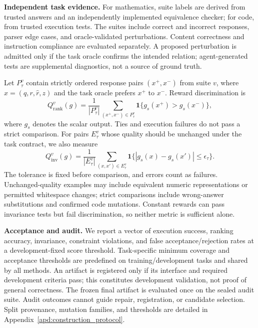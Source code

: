 \noindent\textbf{Independent task evidence.} For mathematics, suite labels are derived from trusted answers and an independently implemented equivalence checker; for code, from trusted execution tests. The suites include correct and incorrect responses, parser edge cases, and oracle-validated perturbations. Content correctness and instruction compliance are evaluated separately. A proposed perturbation is admitted only if the task oracle confirms the intended relation; agent-generated tests are supplemental diagnostics, not a source of ground truth.

Let $P_\tau^v$ contain strictly ordered response pairs $(x^+,x^-)$ from suite $v$, where $x=(q,r,\hat r,z)$ and the task oracle prefers $x^+$ to $x^-$. Reward discrimination is
\begin{equation}
    Q_{\mathrm{rank}}^v(g)=\frac{1}{|P_\tau^v|}
       \sum_{(x^+,x^-)\in P_\tau^v}
       \mathbf{1}\{g_s(x^+)>g_s(x^-)\},
\end{equation}
where $g_s$ denotes the scalar output. Ties and execution failures do not pass a strict comparison. For pairs $E_\tau^v$ whose quality should be unchanged under the task contract, we also measure
\begin{equation}
    Q_{\mathrm{inv}}^v(g)=\frac{1}{|E_\tau^v|}
       \sum_{(x,x')\in E_\tau^v}
       \mathbf{1}\{|g_s(x)-g_s(x')|\leq\epsilon_\tau\}.
\end{equation}
The tolerance is fixed before comparison, and errors count as failures. Unchanged-quality examples may include equivalent numeric representations or permitted whitespace changes; strict comparisons include wrong-answer substitutions and confirmed code mutations. Constant rewards can pass invariance tests but fail discrimination, so neither metric is sufficient alone.

\noindent\textbf{Acceptance and audit.} We report a vector of execution success, ranking accuracy, invariance, constraint violations, and false acceptance/rejection rates at a development-fixed score threshold. Task-specific minimum coverage and acceptance thresholds are predefined on training/development tasks and shared by all methods. An artifact is registered only if its interface and required development criteria pass; this constitutes development validation, not proof of general correctness. The frozen final artifact is evaluated once on the sealed audit suite. Audit outcomes cannot guide repair, registration, or candidate selection. Split provenance, mutation families, and thresholds are detailed in Appendix~\ref{apd:construction_protocol}.

